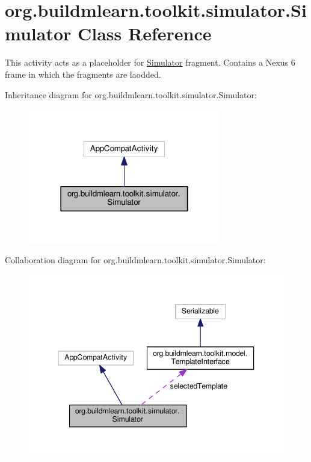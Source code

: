 \hypertarget{classorg_1_1buildmlearn_1_1toolkit_1_1simulator_1_1Simulator}{}\section{org.\+buildmlearn.\+toolkit.\+simulator.\+Simulator Class Reference}
\label{classorg_1_1buildmlearn_1_1toolkit_1_1simulator_1_1Simulator}


This activity acts as a placeholder for \hyperlink{classorg_1_1buildmlearn_1_1toolkit_1_1simulator_1_1Simulator}{Simulator} fragment. Contains a Nexus 6 frame in which the fragments are laodded.  




Inheritance diagram for org.\+buildmlearn.\+toolkit.\+simulator.\+Simulator\+:
\nopagebreak
\begin{figure}[H]
\begin{center}
\leavevmode
\includegraphics[width=238pt]{classorg_1_1buildmlearn_1_1toolkit_1_1simulator_1_1Simulator__inherit__graph}
\end{center}
\end{figure}


Collaboration diagram for org.\+buildmlearn.\+toolkit.\+simulator.\+Simulator\+:
\nopagebreak
\begin{figure}[H]
\begin{center}
\leavevmode
\includegraphics[width=344pt]{classorg_1_1buildmlearn_1_1toolkit_1_1simulator_1_1Simulator__coll__graph}
\end{center}
\end{figure}
